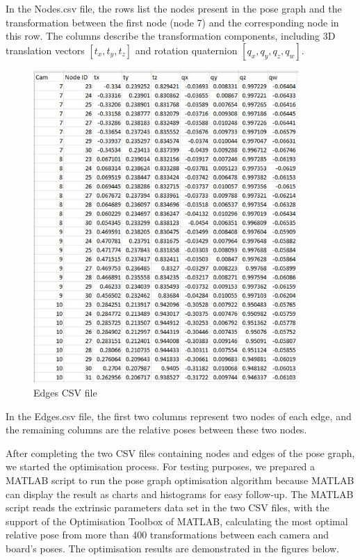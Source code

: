 In the Nodes.csv file, the rows list the nodes present in the pose graph and the transformation between the first node (node 7) and the corresponding node in this row. The columns describe the transformation components, including 3D translation vectors $[t_{x}, t_{y}, t_{z}]$ and rotation quaternion $[q_{x}, q_{y}, q_{z}, q_{w}]$. 

\clearpage
\begin{figure}[ht]
\centering
\includegraphics[width=0.9\textwidth]{Images/CSV Edges.jpg}
\caption{Edges CSV file}
\end{figure}

In the Edges.csv file, the first two columns represent two nodes of each edge, and the remaining columns are the relative poses between these two nodes.

\clearpage
After completing the two CSV files containing nodes and edges of the pose graph, we started the optimisation process. For testing purposes, we prepared a MATLAB script to run the pose graph optimisation algorithm because MATLAB can display the result as charts and histograms for easy follow-up. The MATLAB script reads the extrinsic parameters data set in the two CSV files, with the support of the Optimisation Toolbox of MATLAB, calculating the most optimal relative pose from more than 400 transformations between each camera and board's poses. The optimisation results are demonstrated in the figures below.


